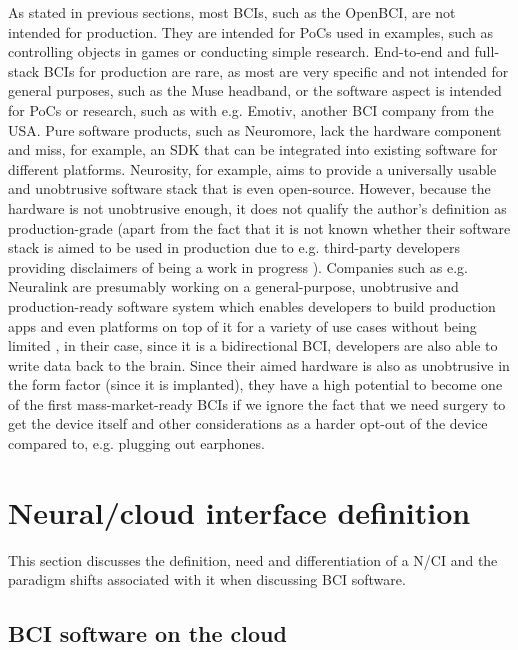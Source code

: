 As stated in previous sections, most BCIs, such as the OpenBCI, are not intended for production. They are intended for PoCs used in examples, such as controlling objects in games or conducting simple research. End-to-end and full-stack BCIs for production are rare, as most are very specific and not intended for general purposes, such as the Muse headband, or the software aspect is intended for PoCs or research, such as with e.g. Emotiv, another BCI company from the USA. Pure software products, such as Neuromore, lack the hardware component and miss, for example, an SDK that can be integrated into existing software for different platforms. Neurosity, for example, aims to provide a universally usable and unobtrusive software stack that is even open-source. However, because the hardware is not unobtrusive enough, it does not qualify the author's definition as production-grade (apart from the fact that it is not known whether their software stack is aimed to be used in production \citep{neurosity_neurosity_2022} due to e.g. third-party developers providing disclaimers of being a work in progress \citep{turney_notion_2022}). Companies such as e.g. Neuralink are presumably working on a general-purpose, unobtrusive and production-ready software system which enables developers to build production apps and even platforms on top of it for a variety of use cases without being limited \citep{musk_integrated_2019}, in their case, since it is a bidirectional BCI, developers are also able to write data back to the brain. Since their aimed hardware is also as unobtrusive in the form factor (since it is implanted), they have a high potential to become one of the first mass-market-ready BCIs if we ignore the fact that we need surgery to get the device itself \citep{neuralink_approach_nodate} and other considerations as a harder opt-out of the device compared to, e.g. plugging out earphones.

\section{Neural/cloud interface definition}
\label{chapter2-neural-cloud-interface-definition}

This section discusses the definition, need and differentiation of a N/CI and the paradigm shifts associated with it when discussing BCI software.

\subsection{BCI software on the cloud}
\label{chapter2-bci-software-on-the-cloud}

